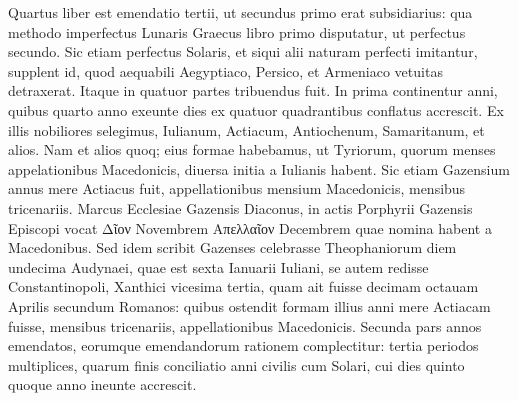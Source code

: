 Quartus liber est emendatio
tertii, ut secundus primo erat subsidiarius: qua methodo imperfectus
Lunaris Graecus libro primo disputatur, ut perfectus secundo.
Sic etiam perfectus Solaris, et siqui alii naturam perfecti imitantur,
supplent id, quod aequabili Aegyptiaco, Persico, et Armeniaco
vetuitas detraxerat.
Itaque in quatuor partes tribuendus fuit.
In
prima continentur anni, quibus quarto anno exeunte dies ex quatuor
quadrantibus conflatus accrescit.
Ex illis nobiliores selegimus,
Iulianum, Actiacum, Antiochenum, Samaritanum, et alios. 
Nam et alios quoq; eius formae habebamus, ut Tyriorum, quorum menses
appelationibus Macedonicis, diuersa initia a Iulianis habent.
Sic
etiam Gazensium annus mere Actiacus fuit, appellationibus mensium 
Macedonicis, mensibus tricenariis. 
Marcus Ecclesiae Gazensis Diaconus,
in actis Porphyrii Gazensis Episcopi vocat \textgreek{Δῖον} Novembrem
\textgreek{Απελλαῖον} Decembrem quae nomina habent a Macedonibus. 
Sed
idem scribit Gazenses celebrasse Theophaniorum diem undecima
Audynaei, quae est sexta Ianuarii Iuliani, se autem redisse Constantinopoli,
Xanthici vicesima tertia, quam ait fuisse decimam octauam
Aprilis secundum Romanos: quibus ostendit formam illius anni mere
Actiacam fuisse, mensibus tricenariis, appellationibus Macedonicis. 
Secunda pars annos emendatos, eorumque emendandorum
rationem complectitur: tertia periodos multiplices, quarum finis
conciliatio anni civilis cum Solari, cui dies quinto quoque anno
ineunte accrescit.

